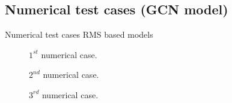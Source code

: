 \documentclass[10pt,aspectratio=169]{beamer} %
\begin{document}
\subsection{Numerical test cases (GCN model)}
\setcounter{subfigure}{0}
\begin{frame}{Numerical test cases RMS based models}
	\begin{minipage}[c]{0.32\textwidth}
		\begin{figure}[c]
			\centering
			\caption{\(1^{st}\) numerical case.}
		\end{figure}
	\end{minipage}
	\hfill
	\begin{minipage}[c]{0.32\textwidth}
		\begin{figure}[c]
			\centering
			\caption{\(2^{nd}\) numerical case.}
		\end{figure}
	\end{minipage}
	\hfill
	\begin{minipage}[c]{0.32\textwidth}
		\begin{figure}[c]
			\centering
			\caption{\(3^{rd}\) numerical case.}
		\end{figure}
	\end{minipage}
\end{frame}
\end{document}
